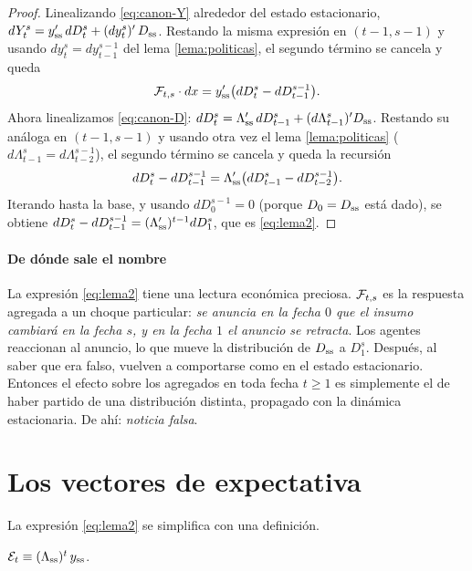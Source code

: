 \begin{proof}
Linealizando \eqref{eq:canon-Y} alrededor del estado estacionario,
$dY^s_t = y_{\mathrm{ss}}'\,dD^s_t + (dy^s_t)'\,D_{\mathrm{ss}}$. Restando la misma expresión en
$(t-1,s-1)$ y usando $dy^s_t = dy^{s-1}_{t-1}$ del lema \ref{lema:politicas},
el segundo término se cancela y queda
\begin{equation}
\mathcal{F}_{t,s}\cdot dx = y_{\mathrm{ss}}'\big(dD^s_t - dD^{s-1}_{t-1}\big).
\end{equation}
Ahora linealizamos \eqref{eq:canon-D}:
$dD^s_t = \Lambda_{\mathrm{ss}}'\,dD^s_{t-1} + (d\Lambda^s_{t-1})'D_{\mathrm{ss}}$. Restando su
análoga en $(t-1,s-1)$ y usando otra vez el lema \ref{lema:politicas}
($d\Lambda^s_{t-1} = d\Lambda^{s-1}_{t-2}$), el segundo término se cancela y
queda la recursión
\begin{equation}
dD^s_t - dD^{s-1}_{t-1} = \Lambda_{\mathrm{ss}}'\big(dD^s_{t-1} - dD^{s-1}_{t-2}\big).
\end{equation}
Iterando hasta la base, y usando $dD^{s-1}_0 = 0$ (porque $D_0 = D_{\mathrm{ss}}$ está
dado), se obtiene $dD^s_t - dD^{s-1}_{t-1} = (\Lambda_{\mathrm{ss}}')^{t-1} dD^s_1$,
que es \eqref{eq:lema2}.
\end{proof}

\paragraph{De dónde sale el nombre} La expresión \eqref{eq:lema2} tiene una
lectura económica preciosa. $\mathcal{F}_{t,s}$ es la respuesta agregada a un choque
particular: \emph{se anuncia en la fecha $0$ que el insumo cambiará en la fecha
$s$, y en la fecha $1$ el anuncio se retracta}. Los agentes reaccionan al
anuncio, lo que mueve la distribución de $D_{\mathrm{ss}}$ a $D^s_1$. Después, al saber
que era falso, vuelven a comportarse como en el estado estacionario. Entonces el
efecto sobre los agregados en toda fecha $t\ge1$ es simplemente el de haber
partido de una distribución distinta, propagado con la dinámica estacionaria.
De ahí: \emph{noticia falsa}.

\section{Los vectores de expectativa}

La expresión \eqref{eq:lema2} se simplifica con una definición.

\begin{definicion}
\label{def:expectativa}
$\mathcal{E}_t \equiv (\Lambda_{\mathrm{ss}})^t\, y_{\mathrm{ss}}$.
\end{definicion}

